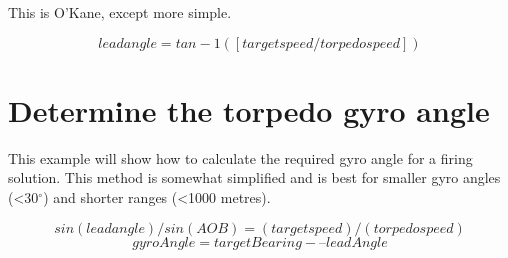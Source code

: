 \documentclass{article}
\newcommand{\degree}{$^{\circ}$}
\begin{document}
This is O'Kane, except more simple.

$$ lead angle = tan-1 ( [target speed / torpedo speed] ) $$


\section{Determine the torpedo gyro angle}
This example will show how to calculate the required gyro angle for a firing solution. This method is somewhat simplified and is best for smaller gyro angles (\textless 30\degree) and shorter ranges (\textless 1000 metres).

$$sin (lead angle) / sin (AOB) = (target speed) / (torpedo speed)$$
$$ gyroAngle = targetBearing -– leadAngle $$


\pagebreak
\end{document}
